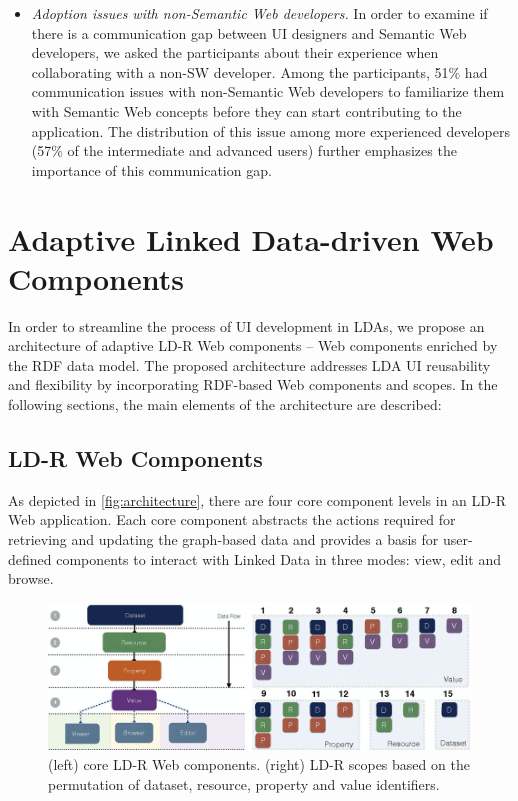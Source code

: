 \documentclass{llncs}
\begin{document}
\begin{itemize}
\item
\emph{Adoption issues with non-Semantic Web developers.}
In order to examine if there is a communication gap between UI designers and Semantic Web developers, we asked the participants about their experience when collaborating with a non-SW developer.
Among the participants, 51\% had communication issues with non-Semantic Web developers to familiarize them with Semantic Web concepts before they can start contributing to the application.
The distribution of this issue among more experienced developers (57\% of the intermediate and advanced users) further emphasizes the importance of this communication gap.

\end{itemize}

\section{Adaptive Linked Data-driven Web Components}
In order to streamline the process of UI development in LDAs, we propose an architecture of adaptive LD-R Web components -- Web components enriched by the RDF data model.
The proposed architecture addresses LDA UI reusability and flexibility by incorporating RDF-based Web components and scopes.
In the following sections, the main elements of the architecture are described:

\subsection{LD-R Web Components}
As depicted in \autoref{fig:architecture}, there are four core component levels in an LD-R Web application.
Each core component abstracts the actions required for retrieving and updating the graph-based data and provides a basis for user-defined components to interact with Linked Data in three modes: view, edit and browse.

\begin{figure}[tb]
\center
  \includegraphics[width=1\linewidth]{images/coreScopes.jpg}
  \caption{(left) core LD-R Web components. (right) LD-R scopes based on the permutation of dataset, resource, property and value identifiers.}
  \label{fig:architecture}
\end{figure}
\end{document}
